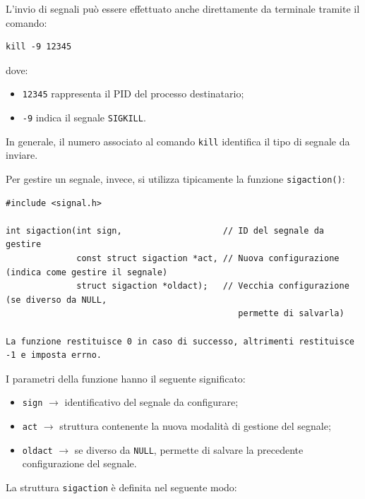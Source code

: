 \noindent
L'invio di segnali può essere effettuato anche direttamente da terminale tramite il comando:

\begin{verbatim}
kill -9 12345
\end{verbatim}

\noindent
dove:
\begin{itemize}
    \item \texttt{12345} rappresenta il PID del processo destinatario;
    \item \texttt{-9} indica il segnale \texttt{SIGKILL}.
\end{itemize}

\noindent
In generale, il numero associato al comando \texttt{kill} identifica il tipo di segnale da inviare.

\bigskip

\noindent Per gestire un segnale, invece, si utilizza tipicamente la funzione \texttt{sigaction()}:

\begin{verbatim}
#include <signal.h>

int sigaction(int sign,                    // ID del segnale da gestire
              const struct sigaction *act, // Nuova configurazione (indica come gestire il segnale)
              struct sigaction *oldact);   // Vecchia configurazione (se diverso da NULL, 
                                              permette di salvarla)

La funzione restituisce 0 in caso di successo, altrimenti restituisce -1 e imposta errno.
\end{verbatim}

\noindent
I parametri della funzione hanno il seguente significato:

\begin{itemize}
    \item \texttt{sign} $\rightarrow$ identificativo del segnale da configurare;
    
    \item \texttt{act} $\rightarrow$ struttura contenente la nuova modalità di gestione del segnale;
    
    \item \texttt{oldact} $\rightarrow$ se diverso da \texttt{NULL}, permette di salvare la precedente configurazione del segnale.
\end{itemize}

\medskip

\noindent La struttura \texttt{sigaction} è definita nel seguente modo:

